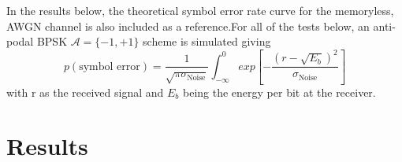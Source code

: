 \par
In the results below, the theoretical symbol error rate curve for the  memoryless, AWGN channel is also included as a reference.For all of the tests below, an anti-podal BPSK $\mathcal{A}= \{-1, +1\}$ scheme is simulated giving  \cite{proakis1988introduction}
\begin{equation*}\label{mmse}
p(\text{symbol error}) = \frac{1}{\sqrt{\pi \sigma_{\text{Noise}}}}
\int_{-\infty}^{0}exp\left[-\frac{(r-\sqrt{E_b})^2}{\sigma_{\text{Noise}}} \right]
 \end{equation*}
with r as the received signal and $E_b$ being the energy per bit at the receiver. 


\section{Results}

